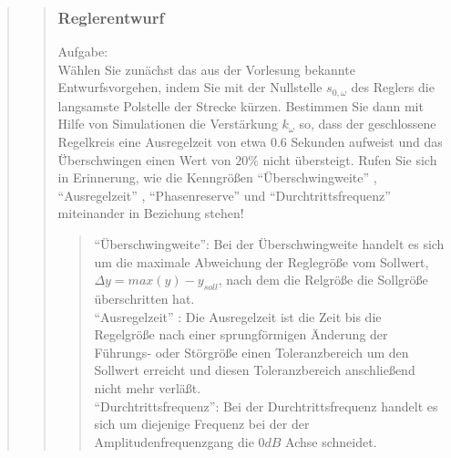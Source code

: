 \begin{quote}
\begin{quote}
        \subsubsection{Reglerentwurf}
        Aufgabe:\\        
        Wählen Sie zunächst das aus der Vorlesung bekannte Entwurfsvorgehen, indem Sie mit der Nullstelle $s_{0,\omega}$
        des Reglers die langsamste Polstelle der Strecke kürzen. Bestimmen Sie dann mit Hilfe von Simulationen die
        Verstärkung $k_\omega$ so, dass der geschlossene Regelkreis eine Ausregelzeit von etwa $0.6$ Sekunden aufweist
        und das Ü̈berschwingen einen Wert von $20\%$ nicht übersteigt. Rufen Sie sich in Erinnerung, wie die
        Kenngrößen ``Überschwingweite'' , ``Ausregelzeit'' , ``Phasenreserve'' und ``Durchtrittsfrequenz''
        miteinander in Beziehung stehen!
		\begin{quote} 
		      ``Überschwingweite'': Bei der Überschwingweite handelt es sich um die maximale Abweichung der Reglegröße vom
		      Sollwert, $\Delta y = max(y) - y_{soll}$, nach dem die Relgröße die Sollgröße überschritten hat.       
		      \cite{Ueberschwingweite}\\
		      \vspace{1em}
		      ``Ausregelzeit'' : Die Ausregelzeit ist die Zeit bis die Regelgröße nach einer sprungförmigen Änderung der
		      Führungs- oder Störgröße einen Toleranzbereich um den Sollwert erreicht und diesen Toleranzbereich anschließend
		      nicht mehr verläßt.
		      \cite{Ausregelzeit}\\
		      \vspace{1em}
		      ``Durchtrittsfrequenz'': Bei der Durchtrittsfrequenz handelt es sich um diejenige Frequenz bei der der
		      Amplitudenfrequenzgang die $0dB$ Achse schneidet.\\
		      
		\end{quote}
        

\end{quote}
\end{quote}
